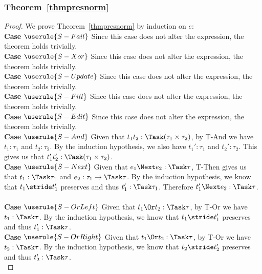 \subsubsection{Theorem~\ref{thmpresnorm}}
\begin{proof}
  We prove Theorem~\ref{thmpresnorm} by induction on $e$:\\

  \noindent\textbf{Case} $\userule{S-Fail}$ Since this case does not alter the
  expression, the theorem holds trivially.\\

  \noindent\textbf{Case} $\userule{S-Xor}$ Since this case does not alter the
  expression, the theorem holds trivially.\\

  \noindent\textbf{Case} $\userule{S-Update}$ Since this case does not alter
  the expression, the theorem holds trivially.\\

  \noindent\textbf{Case} $\userule{S-Fill}$ Since this case does not alter the
  expression, the theorem holds trivially.\\

  \noindent\textbf{Case} $\userule{S-Edit}$ Since this case does not alter the
  expression, the theorem holds trivially.\\

  \noindent\textbf{Case} $\userule{S-And}$ Given that $t_1\And t_2:\Task(\tau_1\times\tau_2)$, by T-And we have $t_1:\tau_1$ and $t_2:\tau_2$. By the induction hypothesis, we also have $t_1':\tau_1$ and $t_2':\tau_2$. This gives us that $t_1'\And t_2':\Task(\tau_1\times\tau_2)$.\\

  \noindent\textbf{Case} $\userule{S-Next}$ Given that $e_1\Next e_2:\Task \tau$, T-Then gives us that $t_1:\Task\tau_1$
  and $e_2:\tau_1 \to \Task \tau$. By the induction hypothesis, we know that
  $t_1\stride t_1'$ preserves and thus $t_1':\Task\tau_1$. Therefore
  $t_1'\Next e_2:\Task\tau$.\\\\

  \noindent\textbf{Case} $\userule{S-OrLeft}$ Given that $t_1\Or t_2:\Task\tau$,
  by T-Or we have $t_1:\Task\tau$. By the induction hypothesis, we know that
  $t_1\stride t_1'$ preserves and thus $t_1':\Task\tau$.\\

  \noindent\textbf{Case} $\userule{S-OrRight}$ Given that $t_1\Or t_2:\Task\tau$,
  by T-Or we have $t_2:\Task\tau$. By the induction hypothesis, we know that
  $t_2\stride t_2'$ preserves and thus $t_2':\Task\tau$. \\


\end{proof}
